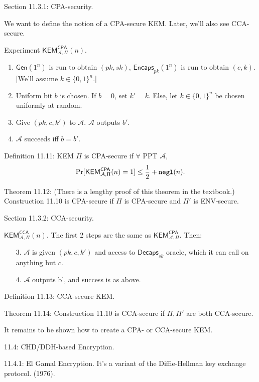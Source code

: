\documentclass[12pt]{article}
\newcommand{\AAA}{\mathcal{A}}
\newcommand{\Encaps}{\mathsf{Encaps}}
\newcommand{\Decaps}{\mathsf{Decaps}}
\newcommand{\Gen}{\mathsf{Gen}}
\newcommand{\ExptKEMCPAArgs}[2]{\mathsf{KEM}^{\mathsf{CPA}}_{#1,#2}}
\newcommand{\ExptKEMCCAArgs}[2]{\mathsf{KEM}^{\mathsf{CCA}}_{#1,#2}}
\newcommand{\ExptKEMCPA}{\ExptKEMCPAArgs{\AAA}{\Pi}}
\newcommand{\ExptKEMCCA}{\ExptKEMCCAArgs{\AAA}{\Pi}}
\newcommand{\negl}{{\tt negl}}
\begin{document}
Section 11.3.1: CPA-security.

We want to define the notion of a CPA-secure KEM. Later, we'll also see CCA-secure.

Experiment $\ExptKEMCPA(n)$.\begin{enumerate}

\item $\Gen(1^n)$ is run to obtain $(pk,sk)$, $\Encaps_{pk}(1^n)$ is run to obtain $(c,k)$. [We'll assume $k\in\{0,1\}^n$.]

\item Uniform bit $b$ is chosen. If $b=0$, set $k'=k$. Else, let $k\in\{0,1\}^n$ be chosen uniformly at random.

\item Give $(pk,c,k')$ to $\AAA$. $\AAA$ outputs $b'$.

\item $\AAA$ succeeds iff $b=b'$.

\end{enumerate}

Definition 11.11: KEM $\Pi$ is CPA-secure if $\forall$ PPT $\AAA$, $$\Pr[\ExptKEMCPA(n)=1]\leq\frac{1}{2}+\negl(n).$$

Theorem 11.12: (There is a lengthy proof of this theorem in the textbook.) Construction 11.10 is CPA-secure if $\Pi$ is CPA-secure and $\Pi'$ is ENV-secure.

Section 11.3.2: CCA-security.

$\ExptKEMCCA(n)$. The first 2 steps are the same as $\ExptKEMCPA$. Then:\begin{itemize}

\item[3.] $\AAA$ is given $(pk,c,k')$ and access to $\Decaps_{sk}$ oracle, which it can call on anything but $c$.

\item[4.] $\AAA$ outputs b', and success is as above.

\end{itemize}

Definition 11.13: CCA-secure KEM.

Theorem 11.14: Construction 11.10 is CCA-secure if $\Pi,\Pi'$ are both CCA-secure.

It remains to be shown how to create a CPA- or CCA-secure KEM.

11.4: CHD/DDH-based Encryption.

11.4.1: El Gamal Encryption. It's a variant of the Diffie-Hellman key exchange protocol. (1976).
\end{document}
